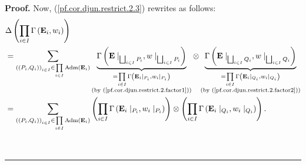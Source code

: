 \documentclass[numbers=enddot,12pt,final,onecolumn,notitlepage,abstracton]{scrartcl}
\theoremstyle{definition}
\newenvironment{proof}[1][Proof]{\noindent\textbf{#1.} }{\ \rule{0.5em}{0.5em}}
\let\sumnonlimits\sum
\let\prodnonlimits\prod
\renewcommand{\sum}{\sumnonlimits\limits}
\renewcommand{\prod}{\prodnonlimits\limits}
\newenvironment{verlong}{}{}
\begin{document}
\begin{verlong}
\begin{footnotesize}
\begin{proof}
Now, (\ref{pf.cor.djun.restrict.2.3}) rewrites as follows:%
\begin{align}
&  \Delta\left(  \prod_{i\in I}\Gamma\left(  \mathbf{E}_{i},w_{i}\right)
\right) \nonumber\\
&  =\sum_{\left(  \left(  P_{i},Q_{i}\right)  \right)  _{i\in I}\in\prod_{i\in
I}\operatorname*{Adm}\left(  \mathbf{E}_{i}\right)  }\underbrace{\Gamma\left(
{\mathbf{E}}\mid_{\bigsqcup_{i\in I}P_{i}},w\mid_{\bigsqcup_{i\in I}P_{i}%
}\right)  }_{\substack{=\prod_{i\in I}\Gamma\left(  \mathbf{E}_{i}\mid_{P_{i}%
},w_{i}\mid_{P_{i}}\right)  \\\text{(by (\ref{pf.cor.djun.restrict.2.factor1}%
))}}}\otimes\underbrace{\Gamma\left(  {\mathbf{E}}\mid_{\bigsqcup_{i\in
I}Q_{i}},w\mid_{\bigsqcup_{i\in I}Q_{i}}\right)  }_{\substack{=\prod_{i\in
I}\Gamma\left(  \mathbf{E}_{i}\mid_{Q_{i}},w_{i}\mid_{Q_{i}}\right)
\\\text{(by (\ref{pf.cor.djun.restrict.2.factor2}))}}}\nonumber\\
&  =\sum_{\left(  \left(  P_{i},Q_{i}\right)  \right)  _{i\in I}\in\prod_{i\in
I}\operatorname*{Adm}\left(  \mathbf{E}_{i}\right)  }\left(  \prod_{i\in
I}\Gamma\left(  \mathbf{E}_{i}\mid_{P_{i}},w_{i}\mid_{P_{i}}\right)  \right)
\otimes\left(  \prod_{i\in I}\Gamma\left(  \mathbf{E}_{i}\mid_{Q_{i}}%
,w_{i}\mid_{Q_{i}}\right)  \right)  . \label{pf.cor.djun.restrict.2.4}%
\end{align}



\end{proof}
\end{footnotesize}
\end{verlong}
\end{document}
